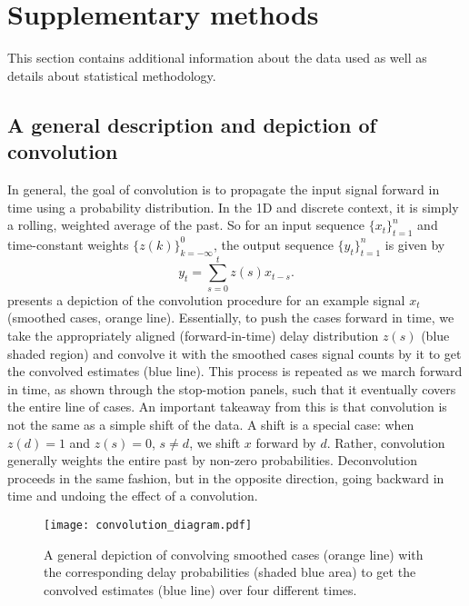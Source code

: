\section{Supplementary methods}

This section contains additional information about the data used as well as
details about statistical methodology.

\subsection{A general description and depiction of convolution}
\label{supp:convol}

In general, the goal of convolution is to propagate the input signal forward in
time using a probability distribution. In the 1D and discrete context, it is
simply a rolling, weighted average of the past. So for an input sequence
$\{x_t\}_{t=1}^n$ and time-constant weights $\{z(k)\}_{k=-\infty}^0$, the output
sequence $\{y_t\}_{t=1}^n$ is given by
\begin{equation}
    y_t = \sum_{s=0}^t z(s)x_{t-s}.
\end{equation}
 presents a depiction of the convolution procedure for an
example signal $x_t$ (smoothed cases, orange line). Essentially, to push the
cases forward in time, we take the appropriately aligned (forward-in-time) delay
distribution $z(s)$ (blue shaded region) and convolve it with the smoothed cases
signal counts by it to get the convolved  estimates (blue line). This process is
repeated as we march forward in time, as shown through the stop-motion panels,
such that it eventually covers the entire line of cases. An important takeaway
from this is that convolution is not the same as a simple shift of the data.
A shift is a special case: when $z(d)=1$ and $z(s)=0$, $s\neq d$, we shift $x$
forward by $d$. Rather, convolution generally weights the entire past by
non-zero probabilities. Deconvolution proceeds in the same fashion, but in the
opposite direction, going backward in time and undoing the effect of a
convolution. 

\begin{figure}[H]
\centering
    \texttt{[image: convolution\_diagram.pdf]}
    \caption{A general depiction of convolving smoothed cases (orange line) with the corresponding delay probabilities (shaded blue area) to get the convolved estimates (blue line) over four different times.}
    \label{fig:convol}
\end{figure}

